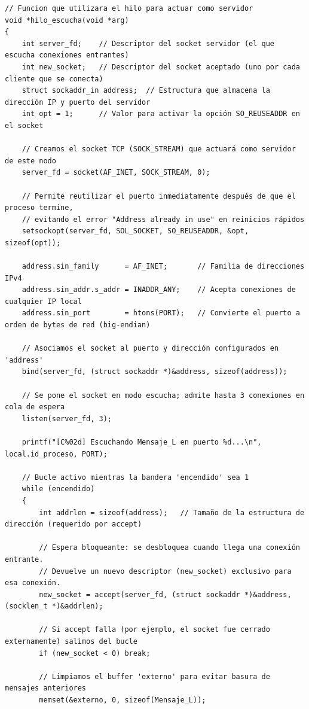 \begin{lstlisting}[style=estiloC]
// Funcion que utilizara el hilo para actuar como servidor
void *hilo_escucha(void *arg)
{
    int server_fd;    // Descriptor del socket servidor (el que escucha conexiones entrantes)
    int new_socket;   // Descriptor del socket aceptado (uno por cada cliente que se conecta)
    struct sockaddr_in address;  // Estructura que almacena la dirección IP y puerto del servidor
    int opt = 1;      // Valor para activar la opción SO_REUSEADDR en el socket

    // Creamos el socket TCP (SOCK_STREAM) que actuará como servidor de este nodo
    server_fd = socket(AF_INET, SOCK_STREAM, 0);

    // Permite reutilizar el puerto inmediatamente después de que el proceso termine,
    // evitando el error "Address already in use" en reinicios rápidos
    setsockopt(server_fd, SOL_SOCKET, SO_REUSEADDR, &opt, sizeof(opt));

    address.sin_family      = AF_INET;       // Familia de direcciones IPv4
    address.sin_addr.s_addr = INADDR_ANY;    // Acepta conexiones de cualquier IP local
    address.sin_port        = htons(PORT);   // Convierte el puerto a orden de bytes de red (big-endian)

    // Asociamos el socket al puerto y dirección configurados en 'address'
    bind(server_fd, (struct sockaddr *)&address, sizeof(address));

    // Se pone el socket en modo escucha; admite hasta 3 conexiones en cola de espera
    listen(server_fd, 3);

    printf("[C%02d] Escuchando Mensaje_L en puerto %d...\n", local.id_proceso, PORT);

    // Bucle activo mientras la bandera 'encendido' sea 1
    while (encendido)
    {
        int addrlen = sizeof(address);   // Tamaño de la estructura de dirección (requerido por accept)

        // Espera bloqueante: se desbloquea cuando llega una conexión entrante.
        // Devuelve un nuevo descriptor (new_socket) exclusivo para esa conexión.
        new_socket = accept(server_fd, (struct sockaddr *)&address, (socklen_t *)&addrlen);

        // Si accept falla (por ejemplo, el socket fue cerrado externamente) salimos del bucle
        if (new_socket < 0) break;

        // Limpiamos el buffer 'externo' para evitar basura de mensajes anteriores
        memset(&externo, 0, sizeof(Mensaje_L));


\end{lstlisting}
